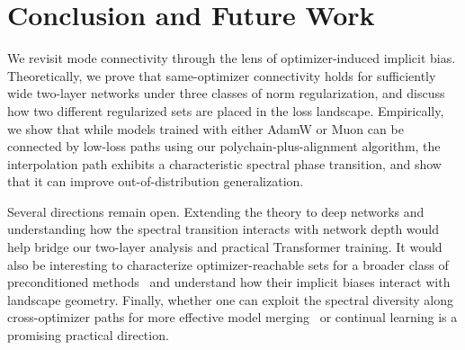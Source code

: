 \documentclass{article}
\begin{document}





\section{Conclusion and Future Work}
\label{sec:conclusion}
We revisit mode connectivity through the lens of optimizer-induced implicit bias. Theoretically, we prove that same-optimizer connectivity holds for sufficiently wide two-layer networks under three classes of norm regularization, and discuss how two different regularized sets are placed in the loss landscape. Empirically, we show that while models trained with either AdamW or Muon can be connected by low-loss paths using our polychain-plus-alignment algorithm, the interpolation path exhibits a characteristic spectral phase transition, and show that it can improve out-of-distribution generalization. 

Several directions remain open. Extending the theory to deep networks and understanding how the spectral transition interacts with network depth would help bridge our two-layer analysis and practical Transformer training. It would also be interesting to characterize optimizer-reachable sets for a broader class of preconditioned methods~\citep{gupta2018shampoopreconditionedstochastictensor,vyas2025soapimprovingstabilizingshampoo} and understand how their implicit biases interact with landscape geometry. Finally, whether one can exploit the spectral diversity along cross-optimizer paths for more effective model merging~\citep{stoica2024zipitmergingmodelsdifferent,crisostomi2024c2m3cycleconsistentmultimodelmerging} or continual learning is a promising practical direction.
\end{document}
